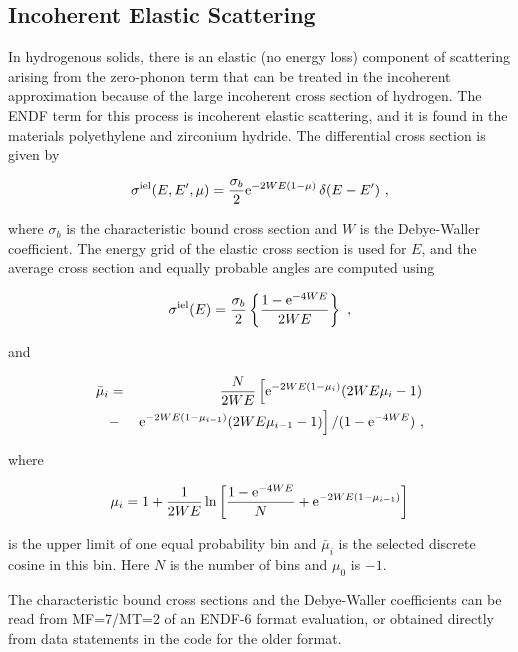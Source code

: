 \subsection{Incoherent Elastic Scattering}
\label{ssTHERMR_incoh_el}

In hydrogenous solids, there is an elastic (no energy loss) component
of scattering arising from the zero-phonon term that can be treated in
the incoherent approximation because of the large incoherent cross
section of hydrogen.  The ENDF term for this process is incoherent
elastic scattering, and it is found in the
materials polyethylene and zirconium hydride.
The differential cross section is given by

\begin{equation}
   \sigma^{\rm iel}(E,E',\mu)=\frac{\sigma_b}{2}
     {\rm e}^{-2WE(1-\mu)}\,\delta(E-E')\,\,,
\end{equation}

\noindent
where $\sigma_b$ is the characteristic bound cross section and $W$ is the
Debye-Waller coefficient.  The energy grid
of the elastic cross section is used for $E$, and the average cross
section and equally probable angles are computed using

\begin{equation}
   \sigma^{\rm iel}(E)=\frac{\sigma_b}{2}\left\{
     \frac{1-{\rm e}^{-4WE}}{2WE}\right\}\,\,,
\end{equation}

\noindent
and

\begin{eqnarray}
   \bar{\mu}_i&=&\frac{N}{2WE}\left[
      {\rm e}^{-2WE(1-\mu_i)}(2WE\mu_i-1)\right.\nonumber\\
      &-&\left.{\rm e}^{-2WE(1-\mu_{i-1})}(2WE\mu_{i-1}-1)
      \right]/(1-{\rm e}^{-4WE})\,\,,
\end{eqnarray}

\noindent
where

\begin{equation}
   \mu_i=1+\frac{1}{2WE}\ln\left[
       \frac{1-{\rm e}^{-4WE}}{N}+{\rm e}^{-2WE(1-\mu_{i-1})}
        \right]
\end{equation}

\noindent
is the upper limit of one equal probability bin and $\bar{\mu}_i$ is
the selected discrete cosine in this bin.  Here $N$ is the number of bins
and $\mu_0$ is $-1$.

The characteristic bound cross sections and the Debye-Waller coefficients
can be read from MF=7/MT=2 of an ENDF-6 format evaluation, or obtained
directly from data statements in the code for the older format.

